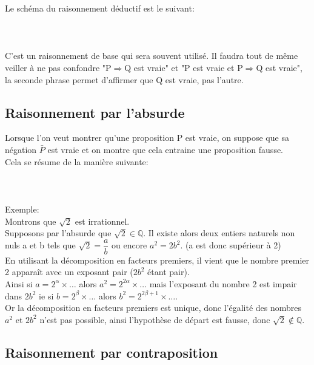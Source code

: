 \documentclass[a4paper,french,12pt]{article}
\begin{document}
Le schéma du raisonnement déductif est le suivant:\\
\\
\textcolor{red}{
}\\
\\
C'est un raisonnement de base qui sera souvent utilisé. Il faudra tout de même veiller à ne pas confondre "P$\Rightarrow$Q est vraie" et "P est vraie et P$\Rightarrow$Q est vraie", la seconde phrase permet d'affirmer que Q est vraie, pas l'autre.

\subsection{Raisonnement par l'absurde}

Lorsque l'on veut montrer qu'une proposition P est vraie, on suppose que sa négation $\bar{P}$ est vraie et on montre que cela entraine une proposition fausse.\\
Cela se résume de la manière suivante:\\
\\
\textcolor{red}{
}\\
\\
Exemple:\\
Montrons que $\sqrt{2}$ est irrationnel.\\
Supposons par l'absurde que $\sqrt{2} \in \mathbb{Q}$. Il existe alors deux entiers naturels non nuls a et b tels que $\sqrt{2} = \dfrac{a}{b}$ ou encore $a^2 = 2b^2$. (a est donc supérieur à 2)\\
En utilisant la décomposition en facteurs premiers, il vient que le nombre premier 2 apparaît avec un exposant pair ($2b^2$ étant pair).\\
Ainsi si $a = 2^{\alpha} \times \dots$ alors $a^2 = 2^{2\alpha} \times \dots$ mais l'exposant du nombre 2 est impair dans $2b^2$ ie si $b = 2^{\beta} \times \dots$ alors $b^2 = 2^{2\beta + 1} \times \dots$.\\
Or la décomposition en facteurs premiers est unique, donc l'égalité des nombres $a^2$ et $2b^2$ n'est pas possible, ainsi l'hypothèse de départ est fausse, donc $\sqrt{2} \notin \mathbb{Q}$.

\subsection{Raisonnement par contraposition}
\end{document}
